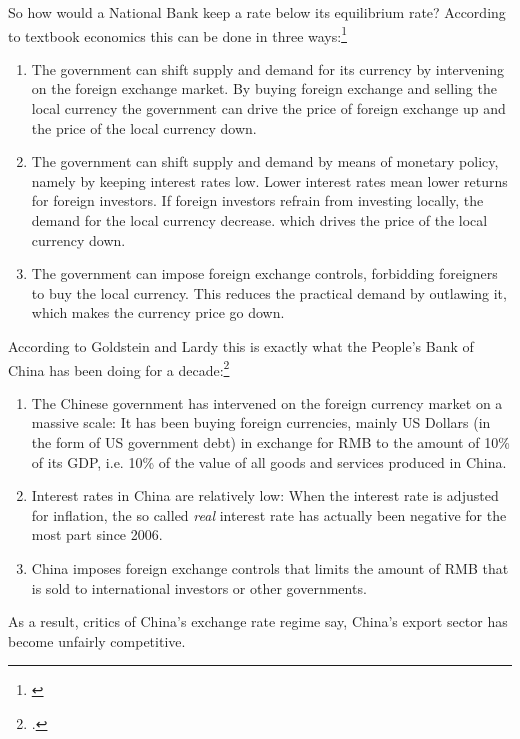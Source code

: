 So how would a National Bank keep a rate below its equilibrium rate? According to 
textbook economics this can be done in three ways:\footnote{\cite[pp. 
514]{Krugman2008}}

\begin{enumerate}
\item{The government can shift supply and demand for its currency by 
	intervening on the foreign exchange market. By buying foreign 
exchange and selling the local currency the government can drive the 
price of foreign exchange up and the price of the local currency down.}
\item{The government can shift supply and demand by means of monetary 
	policy, namely by keeping interest rates low. Lower interest rates 
mean lower returns for foreign investors. If foreign investors refrain 
from investing locally, the demand for the local currency decrease.  
which drives the price of the local currency down.}
\item{The government can impose foreign exchange controls, forbidding 
	foreigners to buy the local currency. This reduces the practical 
demand by outlawing it, which makes the currency price go down.}
\end{enumerate}

According to Goldstein and Lardy this is exactly what the People's Bank 
of China has been doing for a decade:\footnote{\cite[pp.  
40]{Goldstein2008}.}

\begin{enumerate}
\item{The Chinese government has intervened on the foreign currency 
		market on a massive scale: It has been buying foreign 
		currencies, mainly US Dollars (in the form of US government 
		debt) in exchange for RMB to the amount of 10\% of its GDP, i.e. 
		10\% of the value of all goods and services produced in China.} 
	\item{Interest rates in China are relatively low: When the interest 
		rate is adjusted for inflation, the so called \emph{real} 
	interest rate has actually been negative for the most part since 
2006.}
\item{China imposes foreign exchange controls that limits the amount of 
	RMB that is sold to international investors or other governments.}
\end{enumerate}

As a result, critics of China's exchange rate regime say, China's export 
sector has become unfairly competitive. 

